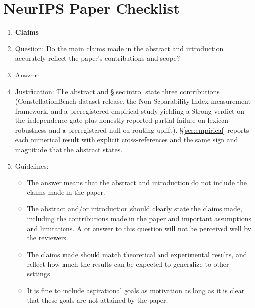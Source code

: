 \section*{NeurIPS Paper Checklist}

\begin{enumerate}

\item {\bf Claims}
    \item[] Question: Do the main claims made in the abstract and introduction accurately reflect the paper's contributions and scope?
    \item[] Answer: \answerYes{}
    \item[] Justification: The abstract and \S\ref{sec:intro} state three contributions (ConstellationBench dataset release, the Non-Separability Index measurement framework, and a preregistered empirical study yielding a Strong verdict on the independence gate plus honestly-reported partial-failure on lexicon robustness and a preregistered null on routing uplift). \S\ref{sec:empirical} reports each numerical result with explicit cross-references and the same sign and magnitude that the abstract states.
    \item[] Guidelines:
    \begin{itemize}
        \item The answer \answerNA{} means that the abstract and introduction do not include the claims made in the paper.
        \item The abstract and/or introduction should clearly state the claims made, including the contributions made in the paper and important assumptions and limitations. A \answerNo{} or \answerNA{} answer to this question will not be perceived well by the reviewers.
        \item The claims made should match theoretical and experimental results, and reflect how much the results can be expected to generalize to other settings.
        \item It is fine to include aspirational goals as motivation as long as it is clear that these goals are not attained by the paper.
    \end{itemize}


\end{enumerate}
